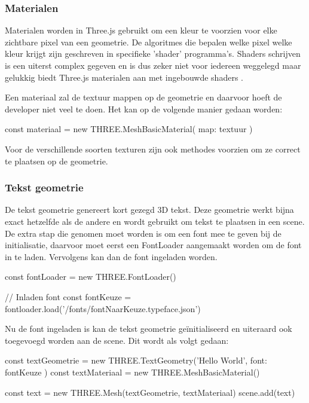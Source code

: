 \subsubsection{Materialen}

Materialen worden in Three.js gebruikt om een kleur te voorzien voor elke zichtbare pixel van een geometrie. De algoritmes die bepalen welke pixel welke kleur krijgt zijn geschreven in specifieke 'shader' programma's. Shaders schrijven is een uiterst complex gegeven en is dus zeker niet voor iedereen weggelegd maar gelukkig biedt Three.js materialen aan met ingebouwde shaders \autocite{Simon2023}.

Een materiaal zal de textuur mappen op de geometrie en daarvoor hoeft de developer niet veel te doen. Het kan op de volgende manier gedaan worden:

\begin{LVerbatim}
const materiaal = new THREE.MeshBasicMaterial({ map: textuur })
\end{LVerbatim}

Voor de verschillende soorten texturen zijn ook methodes voorzien om ze correct te plaatsen op de geometrie.

\subsubsection{Tekst geometrie}

De tekst geometrie genereert kort gezegd 3D tekst. Deze geometrie werkt bijna exact hetzelfde als de andere en wordt gebruikt om tekst te plaatsen in een scene. De extra stap die genomen moet worden is om een font mee te geven bij de initialisatie, daarvoor moet eerst een FontLoader aangemaakt worden om de font in te laden. Vervolgens kan dan de font ingeladen worden.

\begin{LVerbatim}
const fontLoader = new THREE.FontLoader()

// Inladen font
const fontKeuze = fontloader.load('/fonts/fontNaarKeuze.typeface.json')
\end{LVerbatim}

Nu de font ingeladen is kan de tekst geometrie geïnitialiseerd en uiteraard ook toegevoegd worden aan de scene. Dit wordt als volgt gedaan:

\begin{LVerbatim}
const textGeometrie = new THREE.TextGeometry('Hello World', { font: fontKeuze })
const textMateriaal = new THREE.MeshBasicMaterial()

const text = new THREE.Mesh(textGeometrie, textMateriaal)
scene.add(text)
\end{LVerbatim}

